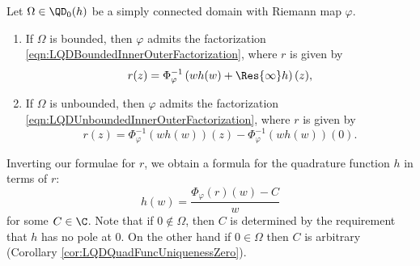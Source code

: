 \documentclass{article}
\numberwithin{equation}{section}
\begin{document}
\begin{theorem}\label{thm:LQDFTInverseProb}
Let $\Omega\in\QD_0(h)$ be a simply connected domain with Riemann map $\varphi$. 
\begin{enumerate}
    \item If $\Omega$ is bounded, then $\varphi$ admits the factorization \ref{eqn:LQDBoundedInnerOuterFactorization}, where $r$ is given by
    \begin{equation}\label{eqn:LQDBoundedFTInverseProbFormula}
        r(z)=\Phi_{\varphi}^{-1}\left(wh(w)+\Res{\infty}h\right)(z),
    \end{equation}
    \item If $\Omega$ is unbounded, then $\varphi$ admits the factorization \ref{eqn:LQDUnboundedInnerOuterFactorization}, where $r$ is given by
    \begin{equation}\label{eqn:LQDUnboundedFTInverseProbFormula}
        r(z)=\Phi_{\varphi}^{-1}\left(wh(w)\right)(z)-\Phi_{\varphi}^{-1}\left(wh(w)\right)(0).
    \end{equation}
\end{enumerate}
\end{theorem}
\noindent Inverting our formulae for $r$, we obtain a formula for the quadrature function $h$ in terms of $r$:
\begin{equation}\label{eqn:LQDhFormula}
    h(w)=\dfrac{\Phi_{\varphi}\left(r\right)(w)-C}{w}
\end{equation}
for some $C\in\C$. Note that if $0\notin\Omega$, then $C$ is determined by the requirement that $h$ has no pole at $0$. On the other hand if $0\in\Omega$ then $C$ is arbitrary (Corollary \ref{cor:LQDQuadFuncUniquenessZero}).\\
\end{document}
